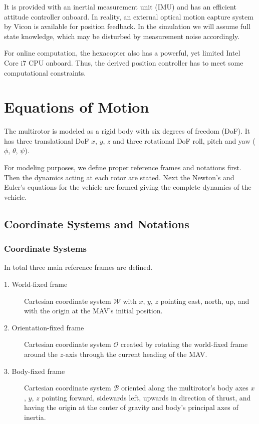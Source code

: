 It is provided with an inertial measurement unit (IMU) and has an efficient attitude controller onboard. In reality, an external optical motion capture system by Vicon is available for position feedback. In the simulation we will assume full state knowledge, which may be disturbed by measurement noise accordingly. 

For online computation, the hexacopter also has a powerful, yet limited Intel Core i7 CPU onboard. Thus, the derived position controller has to meet some computational constraints.

\section{Equations of Motion}
\label{sec:eq_of_motion}
The multirotor is modeled as a rigid body with six degrees of freedom (DoF). It has three translational DoF $x$, $y$, $z$ and three rotational DoF roll, pitch and yaw ($\phi$, $\theta$, $\psi$).

 For modeling purposes, we define proper reference frames and notations first. Then the dynamics acting at each rotor are stated. Next the Newton's and Euler's equations for the vehicle are formed giving the complete dynamics of the vehicle.

\subsection{Coordinate Systems and Notations}
\label{sec:coordinates}
\subsubsection{Coordinate Systems}
In total three main reference frames are defined. 
\begin{description}
\item[1. World-fixed frame] Cartesian coordinate system $\mathcal{W}$ with $x$, $y$, $z$ pointing east, north, up, and with the origin at the MAV's initial position.
\item[2. Orientation-fixed frame] Cartesian coordinate system $\mathcal{O}$ created by rotating the world-fixed frame around the $z$-axis through the current heading of the MAV. 
\item[3. Body-fixed frame] Cartesian coordinate system $\mathcal{B}$ oriented along the multirotor's body axes $x$, $y$, $z$ pointing forward, sidewards left, upwards in direction of thrust, and having the origin at the center of gravity and body's principal axes of inertia.
\end{description}

